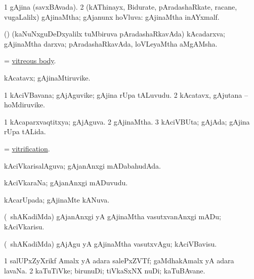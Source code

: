 \bentry
{} 
\gl{\gu}
\expl{}
\bmng
\bnum
\num{1} gAjina (savxBAvada). 
\num{2} (kAThinayx, Bidurate, pAradashaRkate, racane, \mo vugaLalilx) gAjinaMtha; gAjanunx hoVluva:  gAjinaMtha inAYxmalf. 
\enum
\emng
\eentry

\bentry
{}
\gl{\nA}
\expl{}
\bmng
 (\aMrashA) (kaNuNxguDeDxyalilx tuMbiruva pAradashaRkavAda) kAcadarxva; gAjinaMtha darxva; pAradashaRkavAda, loVLeyaMtha aMgAMsha. 
\emng
\eentry

\bentry 
{}
\gl{\nA}
\expl{}
\bmng
 = \hyperlink{vitreous body}{vitreous body}. 
\emng
\eentry

\bentry
{} 
\gl{\nA}
\expl{}
\bmng
 kAcatavx; gAjinaMtiruvike. 
\emng
\eentry

\bentry
{} 
\gl{\nA}
\expl{}
\bmng
\bnum
\num{1} kAciVBavana; gAjAguvike; gAjina rUpa tALuvudu. 
\num{2} kAcatavx, gAjutana -- hoMdiruvike. 
\enum
\emng
\eentry

\bentry 
{} 
\gl{\gu}
\expl{}
\bmng
\bnum
\num{1} kAcaparxvaqtitxya; gAjAguva. 
\num{2} gAjinaMtha. 
\num{3} kAciVBUta; gAjAda; gAjina rUpa tALida. 
\enum
\emng
\eentry

\bentry 
{} 
\gl{\nA}
\expl{}
\bmng
 = \hyperlink{vitrification}{vitrification}. 
\emng
\eentry

\bentry
{} 
\gl{\gu}
\expl{}
\bmng
 kAciVkarisalAguva; gAjanAnxgi mADabahudAda. 
\emng
\eentry

\bentry 
{} 
\gl{\nA}
\expl{}
\bmng
 kAciVkaraNa; gAjanAnxgi mADuvudu. 
\emng
\eentry

\bentry
{} 
\gl{\gu}
\expl{}
\bmng
 kAcarUpada; gAjinaMte kANuva. 
\emng
\eentry

\bentry 
{} 
\gl{\akirx}
\expl{}
\bmng
 (\kanmu\ shAKadiMda) gAjanAnxgi yA gAjinaMtha vasutxvanAnxgi mADu; kAciVkarisu. 
\emng

\noindent 
\gl{\akirx}
\expl{}
\bmng
 (\kanmu\ shAKadiMda) gAjAgu yA gAjinaMtha vasutxvAgu; kAciVBavisu. 
\emng
\eentry

\bentry 
{} 
\gl{\nA}
\expl{}
\bmng
\bnum
\num{1} salUPxZyXrikf Amalx yA adara salePxZVTf; gaMdhakAmalx yA adara lavaNa. 
\num{2} kaTuTiVke; birunuDi; tiVkaSxNX nuDi; kaTuBAvane. 
\enum
\emng

